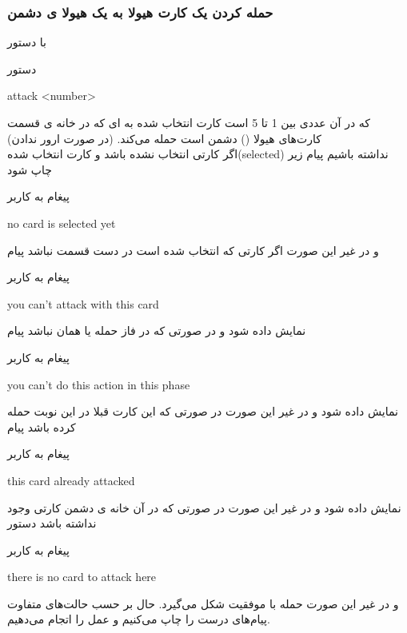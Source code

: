 \documentclass[]{article}
\begin{document}
\subsubsection*{{\titr حمله کردن یک کارت هیولا به یک هیولا ی دشمن 
}}
    با دستور
\begin{mybox}[colback=yellow]{دستور}
	\begin{latin}	
	    attack <number>	
	\end{latin}
\end{mybox}
که در آن  عددی بین 1 تا 5 است کارت انتخاب شده به  ای 
که در خانه ی  قسمت کارت‌های هیولا () دشمن 
است 
حمله می‌کند. (در صورت ارور ندادن)
\\
    اگر کارتی انتخاب نشده باشد و کارت انتخاب شده(selected) نداشته باشیم پیام 
    زیر چاپ شود
\begin{mybox}[colback=yellow]{پیغام به کاربر}
	\begin{latin}	
		no card is selected yet
	\end{latin}
\end{mybox}
و در غیر این صورت اگر کارتی که انتخاب شده است در دست قسمت
 نباشد پیام
\begin{mybox}[colback=yellow]{پیغام به کاربر}
	\begin{latin}	
		you can’t attack with this card
	\end{latin}
\end{mybox}
نمایش داده شود و در صورتی که در فاز حمله یا همان  نباشد 
پیام
\begin{mybox}[colback=yellow]{پیغام به کاربر}
	\begin{latin}	
		you can’t do this action in this phase
	\end{latin}
\end{mybox}
نمایش داده شود و در غیر این صورت در صورتی که این کارت قبلا در این نوبت حمله 
کرده باشد پیام
\begin{mybox}[colback=yellow]{پیغام به کاربر}
	\begin{latin}	
		this card already attacked
	\end{latin}
\end{mybox}
نمایش داده شود و در غیر این صورت در صورتی که در آن خانه ی دشمن کارتی وجود 
نداشته باشد دستور
\begin{mybox}[colback=yellow]{پیغام به کاربر}
	\begin{latin}	
		there is no card to attack here	
	\end{latin}
\end{mybox}
و در غیر این صورت حمله با موفقیت شکل می‌گیرد. حال بر حسب حالت‌های متفاوت 
پیام‌های درست را چاپ می‌کنیم و عمل  را اتجام می‌دهیم.
\end{document}
